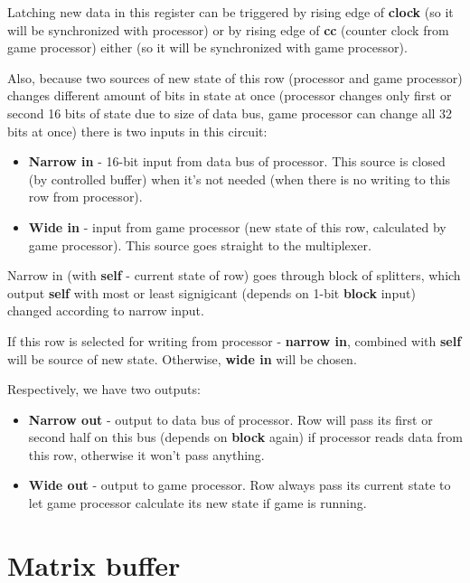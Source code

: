 Latching new data in this register can be triggered by rising edge of \textbf{clock} (so it will be synchronized with processor) or by rising edge of \textbf{cc} (counter clock from game processor) either (so it will be synchronized with game processor).

Also, because two sources of new state of this row (processor and game processor) changes different amount of bits in state at once (processor changes only first or second 16 bits of state due to size of data bus, game processor can change all 32 bits at once) there is two inputs in this circuit:

\begin{itemize}
	\item \textbf{Narrow in} - 16-bit input from data bus of processor. This source is closed (by controlled buffer) when it's not needed (when there is no writing to this row from processor).
	\item \textbf{Wide in} - input from game processor (new state of this row, calculated by game processor). This source goes straight to the multiplexer.
\end{itemize}

Narrow in (with \textbf{self} - current state of row) goes through block of splitters, which output \textbf{self} with most or least signigicant (depends on 1-bit \textbf{block} input) changed according to narrow input.

If this row is selected for writing from processor - \textbf{narrow in}, combined with \textbf{self} will be source of new state. Otherwise, \textbf{wide in} will be chosen.

Respectively, we have two outputs:

\begin{itemize}
	\item \textbf{Narrow out} - output to data bus of processor. Row will pass its first or second half on this bus (depends on \textbf{block} again) if processor reads data from this row, otherwise it won't pass anything.
	\item \textbf{Wide out} - output to game processor. Row always pass its current state to let game processor calculate its new state if game is running.
\end{itemize}

\section*{Matrix buffer}

